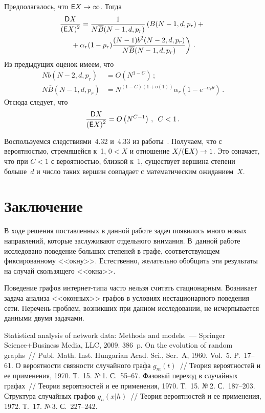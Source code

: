 \begin{multicols}{2}
     Предполагалось, что ${\sf E}X\rightarrow\infty$. Тогда
     \begin{multline*}
     \displaystyle\frac{\displaystyle {\sf D}X\mathstrut}{\displaystyle ({\sf E}X)^2\mathstrut}=\displaystyle\frac{\displaystyle 1\mathstrut}{\displaystyle N\overline{B}(N-1,d,p_r)\mathstrut}\left(
     B(N-1,d,p_r)+{}\right.\\
\left.     {}+\alpha_r(1-p_r)\displaystyle\frac{\displaystyle (N-1) b^2(N-2,d,p_r)\mathstrut}{\displaystyle N\overline{B}(N-1,d,p_r)\mathstrut}\right)\,.
     \end{multline*}
Из предыдущих оценок имеем, что 
\begin{align*}
Nb(N-2,d,p_r) &=O\left(N^{1-C}\right)\,;\\
N\overline{B} (N-1,d,p_r) &= N^{(1-C)(1+o(1))}\alpha_r\left( 1-e^{-\alpha_r\theta}\right)\,.
\end{align*}
Отсюда следует, что
$$
\displaystyle\frac{\displaystyle {\sf D}X\mathstrut}{\displaystyle ({\sf E}X)^2\mathstrut} =O\left(N^{C-1}\right)\,,\enskip C<1\,.
$$
     
     Воспользуемся следствиями~4.32 и~4.33 из работы~\cite{15-gr}. Получаем, что с 
вероятностью, стремящейся к~1, $0<X$ и отношение $X/({\sf E}X)\rightarrow 1$. 
     Это означает, что при $C<1$ с вероятностью, близкой к~1, существует вершина степени 
больше~$d$ и число таких вершин совпадает с математическим ожиданием~$X$. 
     

\section{Заключение}
     
     В ходе решения поставленных в данной работе задач появилось много новых 
направлений, которые заслуживают отдельного внимания. В~данной работе исследовано 
поведение больших степеней в графе, соответствующем фиксированному <<окну>>. 
Естественно, желательно обобщить эти результаты на случай скользящего <<окна>>. 
     
     Поведение графов ин\-тер\-нет-ти\-па часто нельзя считать стационарным. Возникает 
задача анализа <<оконных>> графов в условиях нестационарного поведения сети. 
Перечень проблем, возникших при данном исследовании, не исчерпывается данными 
двумя задачами.

{\small\frenchspacing
{%
\begin{thebibliography}{99}
     
 Statistical analysis of network data: Methods and models.~--- Springer 
Science\;+\;Business Media, LLC, 2009. 386~p. 
 On the evolution of random 
graphs~// Publ. Math. Inst. Hungarian Acad. Sci., Ser.~A, 1960. Vol.~5. P.~17--61.
 О вероятности связности случайного графа $g_m(t)$~// Теория 
вероятностей и ее применения, 1970. Т.~15. №\,1. С.~55--67.
 Фазовый переход в случайных графах~// Теория вероятностей и ее 
применения, 1970. Т.~15. №\,2. С.~187--203.
 Структура случайных графов $g_n(x\vert h)$~// Теория вероятностей 
и ее применения, 1972. Т.~17. №\,3. С.~227--242.


\end{thebibliography}}}
\end{multicols}
